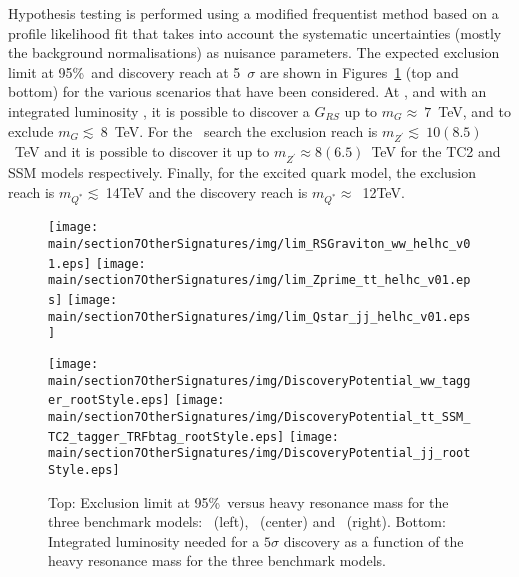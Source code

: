 Hypothesis testing is performed using a modified frequentist method based on a profile likelihood fit that takes into account the systematic uncertainties (mostly the background normalisations) as nuisance parameters. The expected exclusion limit at 95\%~\cl and discovery reach at 5~$\sigma$ are shown in Figures~\ref{fig:hadres_limits} (top and bottom) for the various scenarios that have been considered. At \sqrtshelhc, and with an integrated luminosity \intlumihelhc, it is possible to discover a $G_{RS}$ up to $m_{G}\approx~7$~TeV, and to exclude $m_{G}\lesssim~8$~TeV. For the \zptt\ search the exclusion reach is $m_{Z^{\prime}}\lesssim~10(8.5)$~TeV and it is possible to discover it up to $m_{Z^{\prime}}\approx 8(6.5)$~TeV for the TC2 and SSM models respectively. Finally, for the excited quark model, the exclusion reach is $m_{Q^{*}}\lesssim~$14TeV and the discovery reach is $m_{Q^{*}}\approx$~12TeV.

\begin{figure}[htbp]
  \centering
  \texttt{[image: \\main/section7OtherSignatures/img/lim\_RSGraviton\_ww\_helhc\_v01.eps]}
  \texttt{[image: \\main/section7OtherSignatures/img/lim\_Zprime\_tt\_helhc\_v01.eps]}
  \texttt{[image: \\main/section7OtherSignatures/img/lim\_Qstar\_jj\_helhc\_v01.eps]}

  \texttt{[image: \\main/section7OtherSignatures/img/DiscoveryPotential\_ww\_tagger\_rootStyle.eps]}
  \texttt{[image: \\main/section7OtherSignatures/img/DiscoveryPotential\_tt\_SSM\_TC2\_tagger\_TRFbtag\_rootStyle.eps]}
  \texttt{[image: \\main/section7OtherSignatures/img/DiscoveryPotential\_jj\_rootStyle.eps]}

  \caption{Top: Exclusion limit at 95\%~\cl versus heavy resonance mass for the three benchmark models: \zptt\ (left),  \rsg\ (center) and \qjj\ (right). Bottom: Integrated luminosity needed for a $5\sigma$ discovery as a function of the heavy resonance mass for the three benchmark models.}
  \label{fig:hadres_limits}
\end{figure}

